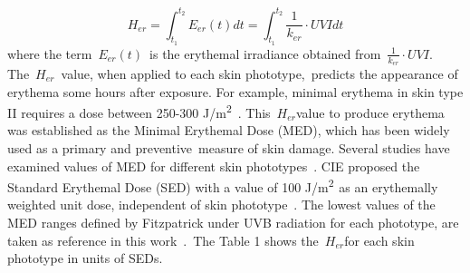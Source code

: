 \documentclass{article}
\begin{document}
\begin{equation}
    H_{er}=\int_{t_{1}}^{t_{2}}{E_{er}(t)} dt=\int_{t_{1}}^{t_{2}}{\frac{1}{k_{er}}\cdot UVI} dt
\end{equation}
where the term~\(E_{er}(t)\)~is
the erythemal irradiance obtained from~\(\frac{1}{k_{er}}\cdot UVI\).
The~\(H_{er}\)~value, when applied to each skin
phototype,~predicts the appearance of erythema some hours after
exposure. For example, minimal erythema in skin type II requires a dose
between 250-300 J/m\textsuperscript{2}~\cite{Fitzpatrick1988,Molina_2010,Perez2014,Serrano_2017,Lehmann_2019}.
This~\(H_{er}\)value to produce erythema was established as the
Minimal Erythemal Dose (MED), which has been widely used as a primary
and preventive~measure of skin damage. Several studies have examined
values of MED for different skin phototypes~\cite{MacKie_2000,Meinhardt2008,Miller2012}. CIE
proposed the Standard Erythemal Dose (SED) with a value of 100
J/m\textsuperscript{2~}as an erythemally weighted unit dose, independent
of skin phototype~\cite{organization2014}. The lowest values of the MED
ranges defined by Fitzpatrick under UVB radiation for each phototype,
are taken as reference in this work~\cite{Fitzpatrick1988}.~The Table 1
shows the~\(H_{er}\)for each skin phototype in units of SEDs.~
\end{document}
